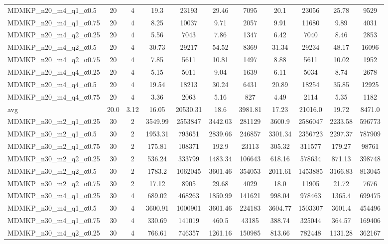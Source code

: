 \begin{table}[!ht]
\begin{tabular}{lcccccccccc}
MDMKP\_n20\_m4\_q1\_α0.5 & 20 & 4 & 19.3 & 23193 & 29.46 & 7095 & 20.1 & 23056 & 25.78 & 9529 \\
MDMKP\_n20\_m4\_q1\_α0.75 & 20 & 4 & 8.25 & 10037 & 9.71 & 2057 & 9.91 & 11680 & 9.89 & 4031 \\
MDMKP\_n20\_m4\_q2\_α0.25 & 20 & 4 & 5.56 & 7043 & 7.86 & 1347 & 6.42 & 7040 & 8.46 & 2853 \\
MDMKP\_n20\_m4\_q2\_α0.5 & 20 & 4 & 30.73 & 29217 & 54.52 & 8369 & 31.34 & 29234 & 48.17 & 16096 \\
MDMKP\_n20\_m4\_q2\_α0.75 & 20 & 4 & 7.85 & 5611 & 10.81 & 1497 & 8.88 & 5611 & 10.02 & 1952 \\
MDMKP\_n20\_m4\_q4\_α0.25 & 20 & 4 & 5.15 & 5011 & 9.04 & 1639 & 6.11 & 5034 & 8.74 & 2678 \\
MDMKP\_n20\_m4\_q4\_α0.5 & 20 & 4 & 19.54 & 18213 & 30.24 & 6431 & 20.89 & 18254 & 35.85 & 12925 \\
MDMKP\_n20\_m4\_q4\_α0.75 & 20 & 4 & 3.36 & 2063 & 5.16 & 827 & 4.49 & 2114 & 5.35 & 1182 \\
\hline avg & 20.0 & 3.12 & 16.05& 20530.31 & 18.6& 3981.81 & 17.23& 21016.0 & 19.72& 8471.0\\ \hline
MDMKP\_n30\_m2\_q1\_α0.25 & 30 & 2 & 3549.99 & 2553847 & 3442.03 & 281129 & 3600.9 & 2586047 & 2233.58 & 596773 \\
MDMKP\_n30\_m2\_q1\_α0.5 & 30 & 2 & 1953.31 & 793651 & 2839.66 & 246857 & 3301.34 & 2356723 & 2297.37 & 787909 \\
MDMKP\_n30\_m2\_q1\_α0.75 & 30 & 2 & 175.81 & 108371 & 192.9 & 23113 & 305.32 & 311577 & 179.27 & 98761 \\
MDMKP\_n30\_m2\_q2\_α0.25 & 30 & 2 & 536.24 & 333799 & 1483.34 & 106643 & 618.16 & 578634 & 871.13 & 398748 \\
MDMKP\_n30\_m2\_q2\_α0.5 & 30 & 2 & 1783.2 & 1062045 & 3601.46 & 354053 & 2011.61 & 1453885 & 3166.83 & 813045 \\
MDMKP\_n30\_m2\_q2\_α0.75 & 30 & 2 & 17.12 & 8905 & 29.68 & 4029 & 18.0 & 11905 & 21.72 & 7676 \\
MDMKP\_n30\_m4\_q1\_α0.25 & 30 & 4 & 689.02 & 468263 & 1850.99 & 141621 & 998.04 & 978463 & 1365.4 & 699475 \\
MDMKP\_n30\_m4\_q1\_α0.5 & 30 & 4 & 3600.91 & 1000901 & 3601.46 & 224183 & 3604.77 & 1503307 & 3601.4 & 454496 \\
MDMKP\_n30\_m4\_q1\_α0.75 & 30 & 4 & 330.69 & 141019 & 460.5 & 43185 & 388.74 & 325044 & 364.57 & 169406 \\
MDMKP\_n30\_m4\_q2\_α0.25 & 30 & 4 & 766.61 & 746357 & 1261.16 & 150985 & 813.66 & 782448 & 1131.28 & 362167 \\

\end{tabular}
\end{table}
